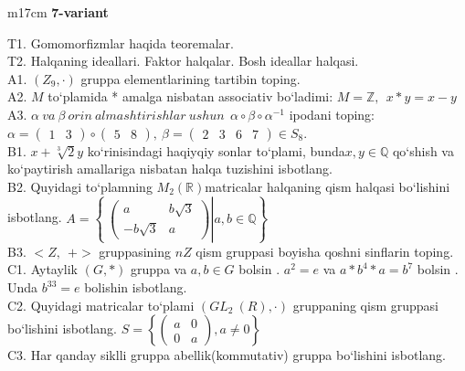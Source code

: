 \documentclass{article}
\begin{document}
\vspace{1cm}


\begin{tabular}{m{17cm}}
\textbf{7-variant}
\newline

T1. Gomomorfizmlar haqida teoremalar. \\
T2. Halqaning ideallari. Faktor halqalar. Bosh ideallar halqasi. \\
A1. \(\left( Z_{9}, \cdot \right)\) gruppa elementlarining tartibin toping. \\
A2. \(M\) to`plamida * amalga nisbatan associativ bo`ladimi: \(M\mathbb{= Z},\ \ x*y = x - y\) \\
A3. \(\alpha\ va\ \beta\ orin\ almashtirishlar\ ushun\ \ \alpha \circ \beta \circ \alpha^{- 1}\) ipodani toping:\(\alpha = \begin{pmatrix}
1 & 3
\end{pmatrix} \circ \begin{pmatrix}
5 & 8
\end{pmatrix},\ \beta = \begin{pmatrix}
2 & 3 & 6 & 7
\end{pmatrix} \in S_{8}\). \\
B1. \(x + \sqrt[3]{2}y\) ko`rinisindagi haqiyqiy sonlar to`plami, bunda\(x,y\mathbb{\in Q}\) qo`shish va ko`paytirish amallariga nisbatan halqa tuzishini isbotlang. \\
B2. Quyidagi to`plamning \(M_{2}(\mathbb{R})\)matricalar halqaning qism halqasi bo`lishini isbotlang. \(A = \left\{ \left. \ \begin{pmatrix}
a & b\sqrt{3} \\
 - b\sqrt{3} & a
\end{pmatrix} \right|a,b\mathbb{\in Q} \right\}\) \\
B3. \(< Z,\ \  + >\) gruppasining \(nZ\) qism gruppasi boyisha qo\textquotesingle shni sinflarin toping. \\
C1. Aytaylik \((G,*)\) gruppa va \(a,b \in G\) bo\textquotesingle lsin . \(a^{2} = e\) va \(a*b^{4}*a = b^{7}\) bo\textquotesingle lsin . Unda \(b^{33} = e\) bolishin isbotlang. \\
C2. Quyidagi matricalar to`plami \((GL_{2}^{\ }\ (R), \cdot )\) gruppaning qism gruppasi bo`lishini isbotlang. \(S = \left\{ \begin{pmatrix}
a & 0 \\
0 & a
\end{pmatrix},a \neq 0 \right\}\) \\
C3. Har qanday siklli gruppa abellik(kommutativ) gruppa bo`lishini isbotlang. \\

\end{tabular}
\vspace{1cm}
\end{document}
